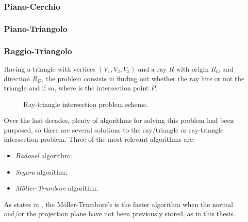 \subsubsection{Piano-Cerchio}
%
\subsubsection{Piano-Triangolo}

\subsubsection{Raggio-Triangolo}
Having a triangle with vertices $(V_1,V_2,V_3)$ and a ray $R$ with origin $R_O$ and direction $R_D$, the problem consists in finding out whether the ray hits or not the triangle and if so, where is the intersection point $P$.
%
\begin{figure}[htbp]
	\centering
	\caption{Ray-triangle intersection problem scheme.}
\end{figure}
%
Over the last decades, plenty of algorithms for solving this problem had been purposed, so there are several solutions to the ray/triangle or ray-triangle intersection problem. Three of the most relevant algorithms are:
\begin{itemize}
	\item \textit{Badouel} algorithm;
	\item \textit{Segura} algorithm;
	\item \textit{M\"oller-Trumbore} algorithm.
\end{itemize}
As \citeauthor{RayTriangle} states in \cite{RayTriangle}, the M\"oller-Trumbore's is the faster algorithm when the normal and/or the projection plane have not been previously stored, as in this thesis.\\
%
